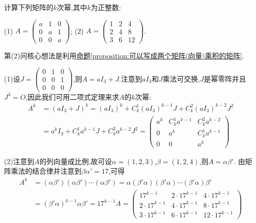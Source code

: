 \documentclass[../../main.tex]{subfiles}%
\begin{document}
\begin{example}
计算下列矩阵的\(k\)次幂,其中\(k\)为正整数:

(1) \(A=\begin{pmatrix}
a & 1 & 0 \\
0 & a & 1 \\
0 & 0 & a
\end{pmatrix}\);\quad
(2) \(A=\begin{pmatrix}
1 & 2 & 4 \\
2 & 4 & 8 \\
3 & 6 & 12
\end{pmatrix}\).
\end{example}
\begin{note}
第(2)问核心想法是利用\hyperref[proposition:可以写成两个矩阵(向量)乘积的矩阵]{命题\ref{proposition:可以写成两个矩阵(向量)乘积的矩阵}}.
\end{note}
\begin{solution}
(1)设\(J=\begin{pmatrix}
0 & 1 & 0 \\
0 & 0 & 1 \\
0 & 0 & 0
\end{pmatrix}\),则\(A = aI_{3}+J\).注意到\(aI_{3}\)和\(J\)乘法可交换,$J$是幂零阵并且\(J^{3}=O\),因此我们可用二项式定理来求\(A\)的\(k\)次幂:
\begin{align*}
A^{k}&=(aI_{3}+J)^{k}=(aI_{3})^{k}+C_{k}^{1}(aI_{3})^{k - 1}J+C_{k}^{2}(aI_{3})^{k - 2}J^{2}\\
&=a^{k}I_{3}+C_{k}^{1}a^{k - 1}J+C_{k}^{2}a^{k - 2}J^{2}=\begin{pmatrix}
a^{k}&C_{k}^{1}a^{k - 1}&C_{k}^{2}a^{k - 2}\\
0&a^{k}&C_{k}^{1}a^{k - 1}\\
0&0&a^{k}
\end{pmatrix}
\end{align*}

(2)注意到\(A\)的列向量成比例,故可设\(\alpha=(1,2,3)\),\(\beta=(1,2,4)\),则\(A = \alpha\beta'\).
由矩阵乘法的结合律并注意到\(\beta\alpha' = 17\),可得
\begin{align*}
A^{k}&=(\alpha\beta')(\alpha\beta')\cdots(\alpha\beta')=\alpha(\beta'\alpha)(\beta'\alpha)\cdots(\beta'\alpha)\beta'\\
&=(\beta'\alpha)^{k - 1}\alpha\beta'=17^{k - 1}A=
\begin{pmatrix}
17^{k - 1}&2\cdot17^{k - 1}&4\cdot17^{k - 1}\\
2\cdot17^{k - 1}&4\cdot17^{k - 1}&8\cdot17^{k - 1}\\
3\cdot17^{k - 1}&6\cdot17^{k - 1}&12\cdot17^{k - 1}
\end{pmatrix}
\end{align*}

\end{solution}
\end{document}
